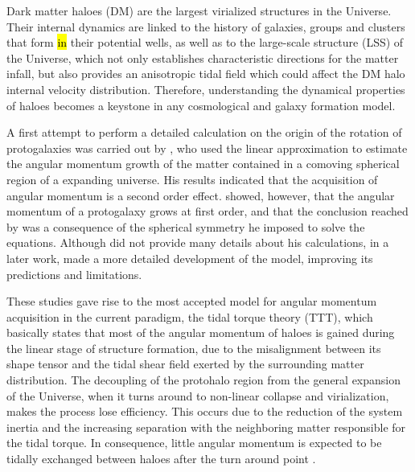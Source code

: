 \documentclass[fleqn,usenatbib]{mnras}
\begin{document}
Dark matter haloes (DM) are the largest virialized structures in the Universe. Their internal dynamics are linked to the history of galaxies, groups and clusters that form \hl{in} their potential wells, as well as to the large-scale structure (LSS) of the Universe, which not only establishes characteristic directions for the matter infall, but also provides an anisotropic tidal field which could affect the DM halo internal velocity distribution. Therefore, understanding the dynamical properties of haloes becomes a keystone in any cosmological and galaxy formation model.

A first attempt to perform a detailed calculation on the origin of the rotation of protogalaxies was carried out by \citet{peebles1969}, who used the linear approximation to estimate the angular momentum growth of the matter contained in a comoving spherical region of a expanding universe. His results indicated that the acquisition of angular momentum is a second order effect. \citet{doroshkevich1970} showed, however, that the angular momentum of a protogalaxy grows at first order, and that the conclusion reached by \citeauthor{peebles1969} was a consequence of the spherical symmetry he imposed to solve the equations. Although \citeauthor{doroshkevich1970} did not provide many details about his calculations, in a later work, \citet{white1984} made a more detailed development of the model, improving its predictions and limitations. 

These studies gave rise to the most accepted model for angular momentum acquisition in the current paradigm, the tidal torque theory (TTT), which basically states that most of the angular momentum of haloes is gained during the linear stage of structure formation, due to the misalignment between its shape tensor and the tidal shear field exerted by the surrounding matter distribution. The decoupling of the protohalo region from the general expansion of the Universe, when it turns around to non-linear collapse and virialization, makes the process lose efficiency. This occurs due to the reduction of the system inertia and the increasing separation with the neighboring matter responsible for the tidal torque. In consequence, little angular momentum is expected to be tidally exchanged between haloes after the turn around point \citep{porcianietal2002a}.
\end{document}
